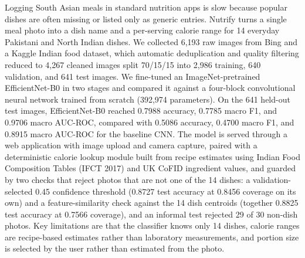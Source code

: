 Logging South Asian meals in standard nutrition apps is slow because popular dishes are often missing or listed only as generic entries. Nutrify turns a single meal photo into a dish name and a per-serving calorie range for 14 everyday Pakistani and North Indian dishes. We collected 6,193 raw images from Bing and a Kaggle Indian food dataset, which automatic deduplication and quality filtering reduced to 4,267 cleaned images split 70/15/15 into 2,986 training, 640 validation, and 641 test images. We fine-tuned an ImageNet-pretrained EfficientNet-B0 in two stages and compared it against a four-block convolutional neural network trained from scratch (392,974 parameters). On the 641 held-out test images, EfficientNet-B0 reached 0.7988 accuracy, 0.7785 macro F1, and 0.9706 macro AUC-ROC, compared with 0.5086 accuracy, 0.4700 macro F1, and 0.8915 macro AUC-ROC for the baseline CNN. The model is served through a web application with image upload and camera capture, paired with a deterministic calorie lookup module built from recipe estimates using Indian Food Composition Tables (IFCT 2017) and UK CoFID ingredient values, and guarded by two checks that reject photos that are not one of the 14 dishes: a validation-selected 0.45 confidence threshold (0.8727 test accuracy at 0.8456 coverage on its own) and a feature-similarity check against the 14 dish centroids (together 0.8825 test accuracy at 0.7566 coverage), and an informal test rejected 29 of 30 non-dish photos. Key limitations are that the classifier knows only 14 dishes, calorie ranges are recipe-based estimates rather than laboratory measurements, and portion size is selected by the user rather than estimated from the photo.

